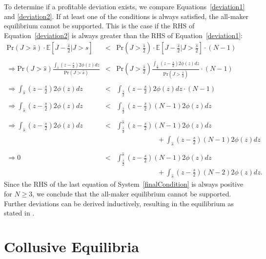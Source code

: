 \documentclass[12pt]{article}
\begin{document}
\begin{appendices}
To determine if a profitable deviation exists, we compare Equations~\eqref{deviation1} and \eqref{deviation2}. If at least one of the conditions is always satisfied, the all-maker equilibrium cannot be supported. This is the case if the RHS of Equation~\eqref{deviation2} is always greater than the RHS of Equation~\eqref{deviation1}:
\begin{equation}
\begin{array}{ccc}
\textrm{Pr}\left(J>\hat{s}\right)\cdot\mathbb{E}\left[J-\frac{\hat{s}}{2}|J>\hat{s}\right]
& < & 
\textrm{Pr}\left(J>\frac{\hat{s}}{2}\right)\cdot\mathbb{E}\left[J-\frac{\hat{s}}{2}|J>\frac{\hat{s}}{2}\right]\cdot(N-1)\\
\\
\Rightarrow \textrm{Pr}(J>\hat{s})\frac{\int_{\hat{s}}(z-\frac{s}{2})2\phi(z)dz}{\textrm{Pr}(J>\hat{s})} 
& < & 
\textrm{Pr}(J>\frac{\hat{s}}{2})\frac{\int_{\frac{\hat{s}}{2}}(z-\frac{s}{2})2\phi(z)dz}{\textrm{Pr}(J>\frac{\hat{s}}{2})}\cdot(N-1)\\
\\
\Rightarrow \int_{\hat{s}}(z-\frac{s}{2})2\phi(z)dz 
& < & 
\int_{\frac{\hat{s}}{2}}(z-\frac{s}{2})2\phi(z)dz\cdot(N-1)\\
\\
\Rightarrow \int_{\hat{s}}(z-\frac{s}{2})2\phi(z)dz 
& < & 
\int_{\frac{\hat{s}}{2}}(z-\frac{s}{2})(N-1)2\phi(z)dz\\
\\
\Rightarrow \int_{\hat{s}}(z-\frac{s}{2})2\phi(z)dz 
& < & 
\int_{\frac{\hat{s}}{2}}^{\hat{s}}(z-\frac{s}{2})(N-1)2\phi(z)dz \\
& & \hspace{1in} +\int_{\hat{s}}(z-\frac{s}{2})(N-1)2\phi(z)dz\\
\\
\Rightarrow 0 
& < & 
\int_{\frac{\hat{s}}{2}}^{\hat{s}}(z-\frac{s}{2})(N-1)2\phi(z)dz \\
& & \hspace{1in} +\int_{\hat{s}}(z-\frac{s}{2})(N-2)2\phi(z)dz. \label{finalCondition}
\end{array}
\end{equation}
Since the RHS of the last equation of System~\eqref{finalCondition} is always positive for $N \geq 3$, we conclude that the all-maker equilibrium cannot be supported. Further deviations can be derived inductively, resulting in the equilibrium as stated in \citet{Budish2015}.

\newpage

\section{Collusive Equilibria}
\label{sec:collusiveEq}


\end{appendices}
\end{document}
